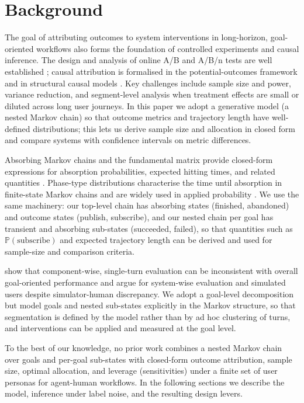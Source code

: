 \section{Background}
\label{sec:background}

The goal of attributing outcomes to system interventions in long-horizon, goal-oriented workflows also forms the foundation of controlled experiments and causal inference. The design and analysis of online A/B and A/B/n tests are well established \citep{kohavi2020trustworthy}; causal attribution is formalised in the potential-outcomes framework \citep{rubin2005causal, imbens2015causal} and in structural causal models \citep{pearl2009causality}. Key challenges include sample size and power, variance reduction, and segment-level analysis when treatment effects are small or diluted across long user journeys. In this paper we adopt a generative model (a nested Markov chain) so that outcome metrics and trajectory length have well-defined distributions; this lets us derive sample size and allocation in closed form and compare systems with confidence intervals on metric differences.

Absorbing Markov chains and the fundamental matrix provide closed-form expressions for absorption probabilities, expected hitting times, and related quantities \citep{kemeny1976finite, norris1997markov}. Phase-type distributions characterise the time until absorption in finite-state Markov chains and are widely used in applied probability \citep{neuts1981matrix}. We use the same machinery: our top-level chain has absorbing states (finished, abandoned) and outcome states (publish, subscribe), and our nested chain per goal has transient and absorbing sub-states (succeeded, failed), so that quantities such as $\mathbb{P}(\text{subscribe})$ and expected trajectory length can be derived and used for sample-size and comparison criteria.

\citet{takanobu2020goal} show that component-wise, single-turn evaluation can be inconsistent with overall goal-oriented performance and argue for system-wise evaluation and simulated users despite simulator-human discrepancy. We adopt a goal-level decomposition but model goals and nested sub-states explicitly in the Markov structure, so that segmentation is defined by the model rather than by ad hoc clustering of turns, and interventions can be applied and measured at the goal level.

To the best of our knowledge, no prior work combines a nested Markov chain over goals and per-goal sub-states with closed-form outcome attribution, sample size, optimal allocation, and leverage (sensitivities) under a finite set of user personas for agent-human workflows. In the following sections we describe the model, inference under label noise, and the resulting design levers.
